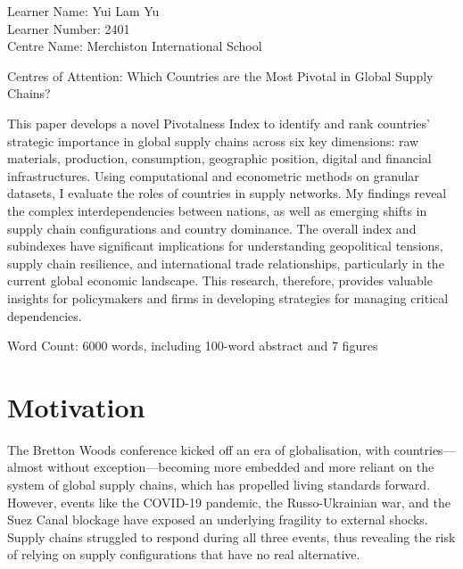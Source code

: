 \documentclass[11pt]{article}
\begin{document}

Learner Name: Yui Lam Yu \\
Learner Number: 2401 \\
Centre Name: Merchiston International School

\vfill

\begin{center}
\begin{minipage}{0.88\linewidth}
\begin{center}
\LARGE
Centres of Attention: Which Countries are the Most Pivotal in Global Supply Chains? \\[0.21in]
\end{center}
\large This paper develops a novel Pivotalness Index to identify and rank countries’ strategic importance in global supply chains across six key dimensions: raw materials, production, consumption, geographic position, digital and financial infrastructures. Using computational and econometric methods on granular datasets, I evaluate the roles of countries in supply networks. My findings reveal the complex interdependencies between nations, as well as emerging shifts in supply chain configurations and country dominance.  The overall index and subindexes have significant implications for understanding geopolitical tensions, supply chain resilience, and international trade relationships, particularly in the current global economic landscape. This research, therefore, provides valuable insights for policymakers and firms in developing strategies for managing critical dependencies.
	\end{minipage}
\end{center}


\vfill

Word Count: 6000 words, including 100-word abstract and 7 figures\\
\phantom{Word Count: 6000 words,}

\newpage
{}

\section{Motivation}
\label{sec:motivation}

The Bretton Woods conference kicked off an era of globalisation, with countries---almost without exception---becoming more embedded and more reliant on the system of global supply chains, which has propelled living standards forward. However, events like the COVID-19 pandemic, the Russo-Ukrainian war, and the Suez Canal blockage have exposed an underlying fragility to external shocks. Supply chains struggled to respond during all three events, thus revealing the risk of relying on supply configurations that have no real alternative.
\end{document}
